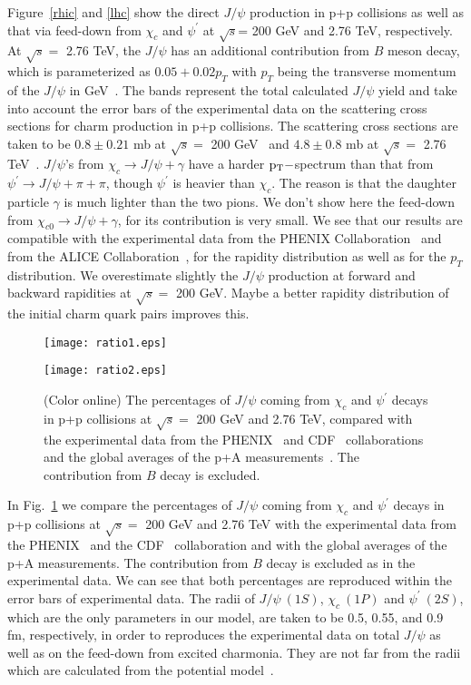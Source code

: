 \documentclass[twocolumn,aps,superscriptaddress,showpacs,nofootinbib,floatfix]{revtex4}
\begin{document}
Figure~\ref{rhic} and \ref{lhc} show the direct $J/\psi$ production in p+p collisions as well as that via  feed-down from  $\chi_c$ and $\psi^\prime$ at $\sqrt{s}$= 200 GeV and 2.76 TeV, respectively.
At  $\sqrt{s}=$ 2.76 TeV, the $J/\psi$ has an additional contribution from $B$ meson decay, which is parameterized as $0.05+0.02 p_T$ with $p_T$ being the transverse momentum of the $J/\psi$ in GeV~\cite{CMS:2011ora}.
The bands represent the total calculated $J/\psi$ yield and take into account the error bars of the experimental data on the scattering cross sections for charm production in p+p collisions.
The scattering cross sections are taken to be $0.8\pm0.21$ mb at $\sqrt{s}=$ 200 GeV~\cite{Adamczyk:2012af} and  $4.8\pm0.8$ mb at $\sqrt{s}=$ 2.76 TeV~\cite{Abelev:2012vra}.
$J/\psi$'s from $\chi_c\rightarrow J/\psi+\gamma$ have a harder $\rm p_T-$spectrum than that from $\psi^\prime\rightarrow J/\psi+\pi+\pi$, though $\psi^\prime$ is heavier than $\chi_c$. The reason is that the daughter particle $\gamma$ is much lighter than the two pions.
We don't show here the feed-down from $\chi_{c0}\rightarrow J/\psi+\gamma$, for its contribution is very small.
We see that our results are compatible with the experimental data from the PHENIX Collaboration~\cite{Adare:2006kf} and from the ALICE Collaboration~\cite{Abelev:2012kr}, for the rapidity distribution as well as for the $p_T$ distribution.
We overestimate slightly the $J/\psi$ production at forward and backward rapidities at $\sqrt{s}=$ 200 GeV. Maybe a better rapidity distribution of the initial charm quark pairs improves this.


\begin{figure}[!h]
\centerline{
\texttt{[image: ratio1.eps]}}
\centerline{
\texttt{[image: ratio2.eps]}}
\caption{(Color online) The percentages of $J/\psi$ coming from $\chi_c$ and $\psi^\prime$ decays in p+p collisions at $\sqrt{s}=$ 200 GeV and 2.76 TeV, compared with the experimental data from the PHENIX~\cite{Adare:2011vq} and CDF~\cite{Abe:1997yz} collaborations and the global averages of the p+A measurements~\cite{Faccioli:2008ir}. The contribution from $B$ decay is excluded.}
\label{feeddown}
\end{figure}

In Fig.~\ref{feeddown} we compare the percentages of $J/\psi$ coming from $\chi_c$ and $\psi^\prime$ decays in p+p collisions at $\sqrt{s}=$ 200 GeV and 2.76 TeV  with the experimental data from the PHENIX~\cite{Adare:2011vq} and the CDF~\cite{Abe:1997yz} collaboration and with the global averages of the p+A measurements.
The contribution from $B$ decay is excluded as in the experimental data.
We can see that both percentages are reproduced within the error bars of experimental data.
The radii of $J/\psi~(1S)$, $\chi_c~(1P)$ and $\psi^\prime~(2S)$, which are the only parameters in our model, are taken to be 0.5, 0.55, and 0.9 fm, respectively, in order to reproduces the experimental data on total $J/\psi$ as well as on the feed-down from excited charmonia.
They are not far from the radii which are calculated from the potential model~\cite{Karsch:1987zw}.
\end{document}

